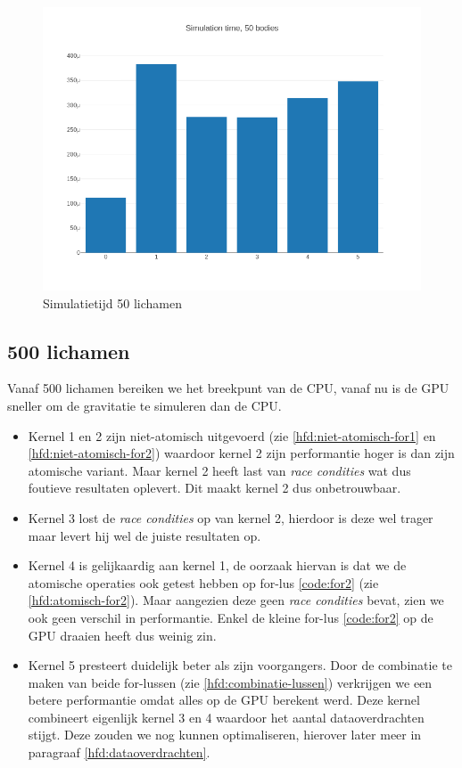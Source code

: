 \documentclass{article}
\begin{document}
\begin{figure}[H]
    \includegraphics[width=\linewidth]{./grafiekskes/hist_simulation50.png}
    \caption{Simulatietijd 50 lichamen}
\end{figure}

\subsection{500 lichamen}
\label{hfd:lichamen-500}
Vanaf 500 lichamen bereiken we het breekpunt van de CPU, vanaf nu is de GPU sneller
om de gravitatie te simuleren dan de CPU.

\begin{itemize}
    \item Kernel 1 en 2 zijn niet-atomisch uitgevoerd (zie \ref{hfd:niet-atomisch-for1} en \ref{hfd:niet-atomisch-for2}) waardoor kernel 2 zijn performantie hoger is dan zijn atomische variant.
    Maar kernel 2 heeft last van \textit{race condities} wat dus foutieve resultaten oplevert. Dit maakt kernel 2 dus onbetrouwbaar.
    \item Kernel 3 lost de \textit{race condities} op van kernel 2, hierdoor is deze wel trager maar levert hij wel de juiste resultaten op.
    \item Kernel 4 is gelijkaardig aan kernel 1, de oorzaak hiervan is dat we de atomische operaties ook getest hebben op for-lus \ref{code:for2} (zie \ref{hfd:atomisch-for2}).
    Maar aangezien deze geen \textit{race condities} bevat, zien we ook geen verschil in performantie. Enkel de kleine for-lus \ref{code:for2} op de GPU draaien heeft dus weinig zin.
    \item Kernel 5 presteert duidelijk beter als zijn voorgangers. Door de combinatie te maken van beide for-lussen (zie \ref{hfd:combinatie-lussen}) verkrijgen we een betere performantie
    omdat alles op de GPU berekent werd. Deze kernel combineert eigenlijk kernel 3 en 4 waardoor het aantal dataoverdrachten stijgt.
    Deze zouden we nog kunnen optimaliseren, hierover later meer in paragraaf \ref{hfd:dataoverdrachten}.
\end{itemize}
\end{document}

